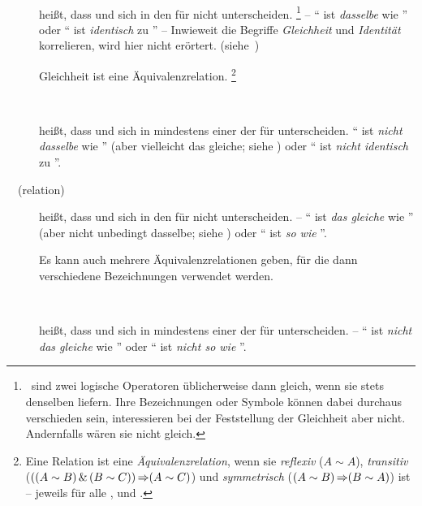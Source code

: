 \begin{description}
	\item[~~\emph{}]\label{def:Gleichheit}
	 heißt, dass  und  sich in den  für \objqt{=} nicht unterscheiden.%
	\footnote{%
		\textZB\ sind zwei logische Operatoren üblicherweise dann gleich, wenn sie stets denselben \emph{} liefern.
		Ihre Bezeichnungen oder Symbole können dabei durchaus verschieden sein, interessieren bei der Feststellung der Gleichheit aber nicht.
		Andernfalls wären sie nicht gleich.
	}
	-- \enquote{ ist \emph{dasselbe} wie } oder \enquote{ ist \emph{identisch} zu }
	-- Inwieweit die Begriffe \emph{Gleichheit} und \emph{Identität} korrelieren, wird hier nicht erörtert. (siehe~\cite{bib:Identitaet})

	Gleichheit ist eine Äquivalenzrelation.%
	\footnote{%
		Eine Relation \objqt{\sim} ist eine \emph{Äquivalenzrelation}, wenn sie \emph{reflexiv} ($A \sim A$), \emph{transitiv} ($((A \sim B) \operatorname{\operatorname{\&}\,} (B \sim C)) \operatorname{\Rightarrow} (A \sim C)$) und \emph{symmetrisch} ($(A \sim B) \operatorname{\Rightarrow} (B \sim A)$) ist -- jeweils für alle ,  und .%
	}
	\item[~~\emph{}]\label{def:Ungleichheit}
	 heißt, dass  und  sich in mindestens einer der  für \objqt{=} unterscheiden. \enquote{ ist \emph{nicht dasselbe} wie } (aber vielleicht das gleiche; siehe \objqt{\equiv}) oder \enquote{ ist \emph{nicht identisch} zu }.
	\item[~~\emph{}(relation)]\label{def:Äquivalenz}
	 heißt, dass  und  sich in den  für \objqt{\equiv} nicht unterscheiden.
	-- \enquote{ ist \emph{das gleiche} wie } (aber nicht unbedingt dasselbe; siehe \objqt{\eq}) oder \enquote{ ist \emph{so wie} }.

	Es kann auch mehrere Äquivalenzrelationen geben, für die dann verschiedene Bezeichnungen verwendet werden.
	\item[~~\emph{}]\label{def:Kontravalenz}
	 heißt, dass  und  sich in mindestens einer der  für \objqt{\nequiv} unterscheiden.
	-- \enquote{ ist \emph{nicht das gleiche} wie } oder \enquote{ ist \emph{nicht so wie} }.
\end{description}

